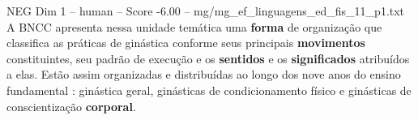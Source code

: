 \begin{textsample}{NEG Dim 1 – human – Score -6.00 – mg/mg\_ef\_linguagens\_ed\_fis\_11\_p1.txt}  \label{ex:f1_neg_014}
A BNCC apresenta nessa unidade temática uma \textbf{forma} de organização que classifica as práticas de ginástica conforme seus principais \textbf{movimentos} constituintes, seu padrão de execução e os \textbf{sentidos} e os \textbf{significados} atribuídos a elas.
Estão assim organizadas e distribuídas ao longo dos nove anos do ensino fundamental : ginástica geral, ginásticas de condicionamento físico e ginásticas de conscientização \textbf{corporal}.

\end{textsample}
